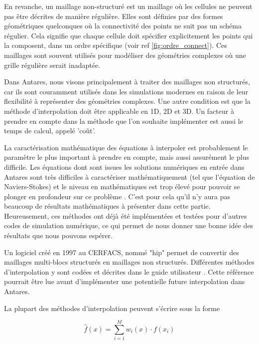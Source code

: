 En revanche, un maillage non-structuré est un maillage où les cellules ne peuvent pas être décrites de manière régulière. Elles sont définies par des formes géométriques quelconques où la connectivité des points ne suit pas un schéma régulier. Cela signifie que chaque cellule doit spécifier explicitement les points qui la composent, dans un ordre spécifique (voir ref \ref{fig:ordre_connect}). Ces maillages sont souvent utilisés pour modéliser des géométries complexes où une grille régulière serait inadaptée.

Dans Antares, nous visons principalement à traiter des maillages non structurés, car ils sont couramment utilisés dans les simulations modernes en raison de leur flexibilité à représenter des géométries complexes. Une autre condition est que la méthode d'interpolation doit être applicable en 1D, 2D et 3D. Un facteur à prendre en compte dans la méthode que l'on souhaite implémenter est aussi le temps de calcul, appelé 'coût'.

La caractérisation mathématique des équations à interpoler est probablement le paramètre le plus important à prendre en compte, mais aussi assurément le plus difficile. Les équations dont sont issues les solutions numériques en entrée dans Antares sont très difficiles à caractériser mathématiquement (tel que l'équation de Naviers-Stokes) et le niveau en mathématiques est trop élevé pour pouvoir se plonger en profondeur sur ce problème \cite{gordont1971_2}. C'est pour cela qu'il n'y aura pas beaucoup de résultats mathématiques à présenter dans cette partie.
Heureusement, ces méthodes ont déjà été implémentées et testées pour d'autres codes de simulation numérique, ce qui permet de nous donner une bonne idée des résultats que nous pouvons espérer.


Un logiciel créé en 1997 au CERFACS, nommé "hip" permet de convertir des maillages multi-blocs structurés en maillages non structurés.
Différentes méthodes d'interpolation y sont codées et décrites dans le guide utilisateur \cite{muller2020}. Cette référence pourrait être lue avant d'implémenter une potentielle future interpolation dans Antares.

La plupart des méthodes d'interpolation peuvent s'écrire sous la forme

\[
\hat{f}(x) = \sum_{i=1}^{M} w_i(x) \cdot f(x_i)
\]

